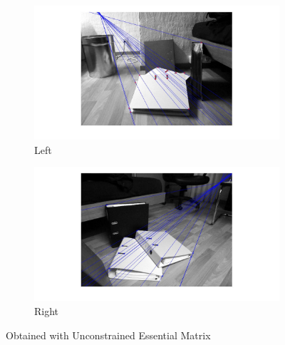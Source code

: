 \documentclass[paper=a4, fontsize=11pt]{scrartcl} %
\numberwithin{equation}{section} %
\numberwithin{figure}{section} %
\numberwithin{table}{section} %
\begin{document}
\begin{figure}
\centering
\begin{subfigure}{.5\textwidth}
  \centering
  \includegraphics[width=1.5\linewidth]{e1.jpg}
  \caption{Left}
\end{subfigure}%
\begin{subfigure}{.7\textwidth}
  \centering
  \includegraphics[width=1.1\linewidth]{e2.jpg}
  \caption{Right}
\end{subfigure}
\caption{Obtained with Unconstrained Essential Matrix}
\label{fig:f}
\end{figure}
\end{document}
